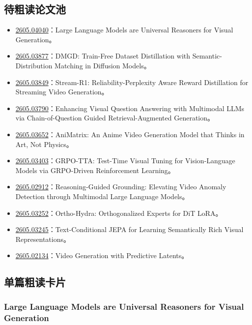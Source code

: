 \subsection{待粗读论文池}

\begin{itemize}[leftmargin=1.5em]
  \item \href{https://arxiv.org/abs/2605.04040}{2605.04040}：Large Language Models are Universal Reasoners for Visual Generation。
  \item \href{https://arxiv.org/abs/2605.03877}{2605.03877}：DMGD: Train-Free Dataset Distillation with Semantic-Distribution Matching in Diffusion Models。
  \item \href{https://arxiv.org/abs/2605.03849}{2605.03849}：Stream-R1: Reliability-Perplexity Aware Reward Distillation for Streaming Video Generation。
  \item \href{https://arxiv.org/abs/2605.03790}{2605.03790}：Enhancing Visual Question Answering with Multimodal LLMs via Chain-of-Question Guided Retrieval-Augmented Generation。
  \item \href{https://arxiv.org/abs/2605.03652}{2605.03652}：AniMatrix: An Anime Video Generation Model that Thinks in Art, Not Physics。
  \item \href{https://arxiv.org/abs/2605.03403}{2605.03403}：GRPO-TTA: Test-Time Visual Tuning for Vision-Language Models via GRPO-Driven Reinforcement Learning。
  \item \href{https://arxiv.org/abs/2605.02912}{2605.02912}：Reasoning-Guided Grounding: Elevating Video Anomaly Detection through Multimodal Large Language Models。
  \item \href{https://arxiv.org/abs/2605.03252}{2605.03252}：Ortho-Hydra: Orthogonalized Experts for DiT LoRA。
  \item \href{https://arxiv.org/abs/2605.03245}{2605.03245}：Text-Conditional JEPA for Learning Semantically Rich Visual Representations。
  \item \href{https://arxiv.org/abs/2605.02134}{2605.02134}：Video Generation with Predictive Latents。
\end{itemize}

\subsection{单篇粗读卡片}

\subsubsection{Large Language Models are Universal Reasoners for Visual Generation}


